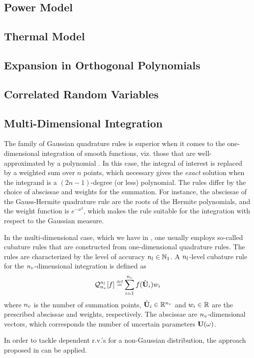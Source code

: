 \subsection{Power Model} 


\subsection{Thermal Model} 


\subsection{Expansion in Orthogonal Polynomials}


\subsection{Correlated Random Variables}

\subsection{Multi-Dimensional Integration} 
The family of Gaussian quadrature rules is superior when it comes to the one-dimensional integration of smooth functions, viz. those that are well-approximated by a polynomial \cite{press2007}. In this case, the integral of interest is replaced by a weighted sum over $n$ points, which necessary gives the \emph{exact} solution when the integrand is a $(2n - 1)$-degree (or less) polynomial. The rules differ by the choice of abscissae and weights for the summation. For instance, the abscissae of the Gauss-Hermite quadrature rule are the roots of the Hermite polynomials, and the weight function is $e^{-x^2}$, which makes the rule suitable for the integration with respect to the Gaussian measure.

In the multi-dimensional case, which we have in , one usually employs so-called cubature rules that are constructed from one-dimensional quadrature rules. The rules are characterized by the level of accuracy ${n_l} \in \mathbb{N}_{1}$. A ${n_l}$-level cubature rule for the ${n_v}$-dimensional integration is defined as
\[
  \oCub{\vars}{\cblevel}{f} \eqdef \sum_{i = 1}^{\cbpoints} f(\cbp{\vU}_i) w_i
\]
where ${n_c}$ is the number of summation points, $\cbp{\vU}_i \in \real^\vars$ and $w_i \in \mathbb{R}$ are the prescribed abscissae and weights, respectively. The abscissae are ${n_v}$-dimensional vectors, which corresponds the number of uncertain parameters $\vU(\o)$.

In order to tackle dependent r.v.'s for a non-Gaussian distribution, the approach proposed in \cite{babuska2010} can be applied.
